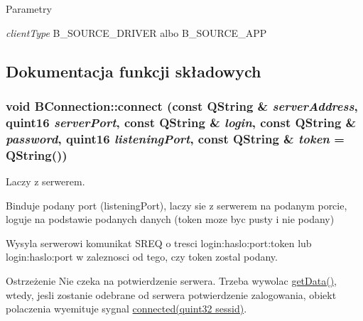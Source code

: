 \begin{DoxyParams}{Parametry}
\item[{\em clientType}]B\_\-SOURCE\_\-DRIVER albo B\_\-SOURCE\_\-APP \end{DoxyParams}


\subsection{Dokumentacja funkcji składowych}
\hypertarget{class_b_connection_aac501a13f453169ed00bc3d4f8664040}{
\subsubsection[{connect}]{\setlength{\rightskip}{0pt plus 5cm}void BConnection::connect (const QString \& {\em serverAddress}, \/  quint16 {\em serverPort}, \/  const QString \& {\em login}, \/  const QString \& {\em password}, \/  quint16 {\em listeningPort}, \/  const QString \& {\em token} = {\ttfamily QString()})}}
\label{class_b_connection_aac501a13f453169ed00bc3d4f8664040}


Laczy z serwerem. 

Binduje podany port (listeningPort), laczy sie z serwerem na podanym porcie, loguje na podstawie podanych danych (token moze byc pusty i nie podany)

Wysyla serwerowi komunikat SREQ o tresci login:haslo:port:token lub login:haslo:port w zaleznosci od tego, czy token zostal podany.

\begin{DoxyWarning}{Ostrzeżenie}
Nie czeka na potwierdzenie serwera. Trzeba wywolac \hyperlink{class_b_connection_a68fb4ff5ee98e5228378d08a2fe2ae19}{getData()}, wtedy, jesli zostanie odebrane od serwera potwierdzenie zalogowania, obiekt polaczenia wyemituje sygnal \hyperlink{class_b_connection_a90dca3f0343427e31bb4544a8accf56d}{connected(quint32 sessid)}. 
\end{DoxyWarning}

